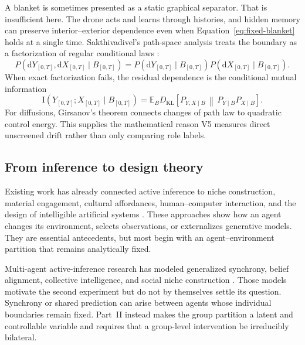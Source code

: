 \documentclass[11pt,a4paper]{article}
\numberwithin{equation}{section}
\newcommand{\KL}{D_{\mathrm{KL}}}
\newcommand{\MI}{\mathrm{I}}
\newcommand{\E}{\mathbb{E}}
\begin{document}
A blanket is sometimes presented as a static graphical separator. That is
insufficient here. The drone acts and learns through histories, and hidden
memory can preserve interior--exterior dependence even when
Equation~\eqref{eq:fixed-blanket} holds at a single time. Sakthivadivel's
path-space analysis treats the boundary as a factorization of regular
conditional laws \cite{sakthivadivel2026}:
\begin{equation}
 P(\mathrm dY_{[0,T]},\mathrm dX_{[0,T]}\mid B_{[0,T]})
 =P(\mathrm dY_{[0,T]}\mid B_{[0,T]})
  P(\mathrm dX_{[0,T]}\mid B_{[0,T]}).
 \label{eq:path-factor}
\end{equation}
When exact factorization fails, the residual dependence is the conditional
mutual information
\begin{equation}
 \MI(Y_{[0,T]};X_{[0,T]}\mid B_{[0,T]})
 =\E_{B}\KL\!\left[P_{Y,X\mid B}\,
 \middle\|\,P_{Y\mid B}P_{X\mid B}\right].
 \label{eq:path-cmi}
\end{equation}
For diffusions, Girsanov's theorem connects changes of path law to quadratic
control energy. This supplies the mathematical reason V5 measures direct
unscreened drift rather than only comparing role labels.

\subsection{From inference to design theory}

Existing work has already connected active inference to niche construction,
material engagement, cultural affordances, human--computer interaction, and
the design of intelligible artificial systems
\cite{bruineberg2018,constant2018,constant2021,veissiere2020,
albarracin2024,friston2024ecosystems,murraysmith2025}. These approaches show
how an agent changes its environment, selects observations, or externalizes
generative models. They are essential antecedents, but most begin with an
agent--environment partition that remains analytically fixed.

Multi-agent active-inference research has modeled generalized synchrony,
belief alignment, collective intelligence, and social niche construction
\cite{palacios2019,kaufmann2021,ramstead2020}. Those models motivate the
second experiment but do not by themselves settle its question. Synchrony or
shared prediction can arise between agents whose individual boundaries remain
fixed. Part~II instead makes the group partition a latent and controllable
variable and requires that a group-level intervention be irreducibly
bilateral.
\end{document}
